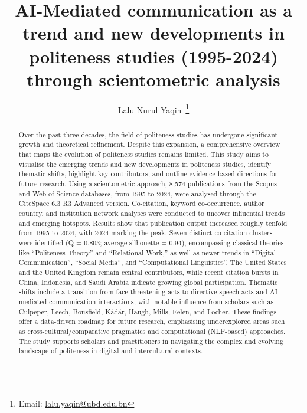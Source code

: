 \documentclass[english]{textolivre}
\title{AI-Mediated communication as a trend and new developments in politeness studies (1995-2024) through scientometric analysis}
\author[1]{Lalu Nurul Yaqin~\orcid{0000-0002-2330-9209}\thanks{Email: \href{mailto:lalu.yaqin@ubd.edu.bn}{lalu.yaqin@ubd.edu.bn}}}
\affil[1]{Universiti Brunei Darussalam, Bandar Seri Begawan, Brunei Darussalam.}
\begin{document}
\maketitle

\begin{polyabstract}
\begin{abstract}
Over the past three decades, the field of politeness studies has undergone significant growth and theoretical refinement. Despite this expansion, a comprehensive overview that maps the evolution of politeness studies remains limited. This study aims to visualise the emerging trends and new developments in politeness studies, identify thematic shifts, highlight key contributors, and outline evidence-based directions for future research. Using a scientometric approach, 8,574 publications from the Scopus and Web of Science databases, from 1995 to 2024, were analysed through the CiteSpace 6.3 R3 Advanced version. Co-citation, keyword co-occurrence, author country, and institution network analyses were conducted to uncover influential trends and emerging hotspots. Results show that publication output increased roughly tenfold from 1995 to 2024, with 2024 marking the peak. Seven distinct co-citation clusters were identified (Q = 0.803; average silhouette = 0.94), encompassing classical theories like ``Politeness Theory'' and ``Relational Work,'' as well as newer trends in ``Digital Communication'', ``Social Media'', and ``Computational Linguistics''. The United States and the United Kingdom remain central contributors, while recent citation bursts in China, Indonesia, and Saudi Arabia indicate growing global participation. Thematic shifts include a transition from face-threatening acts to directive speech acts and AI-mediated communication interactions, with notable influence from scholars such as Culpeper, Leech, Bousfield, Kádár, Haugh, Mills, Eelen, and Locher. These findings offer a data-driven roadmap for future research, emphasising underexplored areas such as cross-cultural/comparative pragmatics and computational (NLP-based) approaches. The study supports scholars and practitioners in navigating the complex and evolving landscape of politeness in digital and intercultural contexts.

\end{abstract}


\end{polyabstract}
\end{document}
